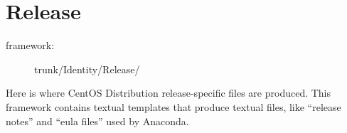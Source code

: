 
\section{Release}
\hypertarget{sec:Concepts:Identity:Release}{}
\label{sec:Concepts:Identity:Release}

\begin{description}
\item[framework:] trunk/Identity/Release/
\end{description}

\noindent Here is where CentOS Distribution release-specific files are
produced.  This framework contains textual templates that produce
textual files, like ``release notes'' and ``eula files'' used by
Anaconda.

